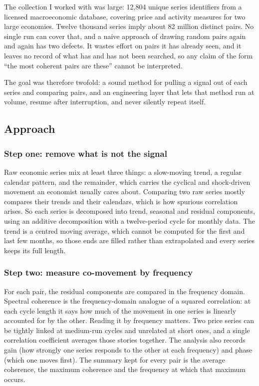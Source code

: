 \documentclass[
  british,
  a4paper,
]{article}
\begin{document}
The collection I worked with was large: 12,804 unique series identifiers
from a licensed macroeconomic database, covering price and activity
measures for two large economies. Twelve thousand series imply about 82
million distinct pairs. No single run can cover that, and a naive
approach of drawing random pairs again and again has two defects. It
wastes effort on pairs it has already seen, and it leaves no record of
what has and has not been searched, so any claim of the form ``the most
coherent pairs are these'' cannot be interpreted.

The goal was therefore twofold: a sound method for pulling a signal out
of each series and comparing pairs, and an engineering layer that lets
that method run at volume, resume after interruption, and never silently
repeat itself.

\subsection{Approach}\label{approach}

\subsubsection{Step one: remove what is not the
signal}\label{step-one-remove-what-is-not-the-signal}

Raw economic series mix at least three things: a slow-moving trend, a
regular calendar pattern, and the remainder, which carries the cyclical
and shock-driven movement an economist usually cares about. Comparing
two raw series mostly compares their trends and their calendars, which
is how spurious correlation arises. So each series is decomposed into
trend, seasonal and residual components, using an additive decomposition
with a twelve-period cycle for monthly data. The trend is a centred
moving average, which cannot be computed for the first and last few
months, so those ends are filled rather than extrapolated and every
series keeps its full length.

\subsubsection{Step two: measure co-movement by
frequency}\label{step-two-measure-co-movement-by-frequency}

For each pair, the residual components are compared in the frequency
domain. Spectral coherence is the frequency-domain analogue of a squared
correlation: at each cycle length it says how much of the movement in
one series is linearly accounted for by the other. Reading it by
frequency matters. Two price series can be tightly linked at medium-run
cycles and unrelated at short ones, and a single correlation coefficient
averages those stories together. The analysis also records gain (how
strongly one series responds to the other at each frequency) and phase
(which one moves first). The summary kept for every pair is the average
coherence, the maximum coherence and the frequency at which that maximum
occurs.
\end{document}
